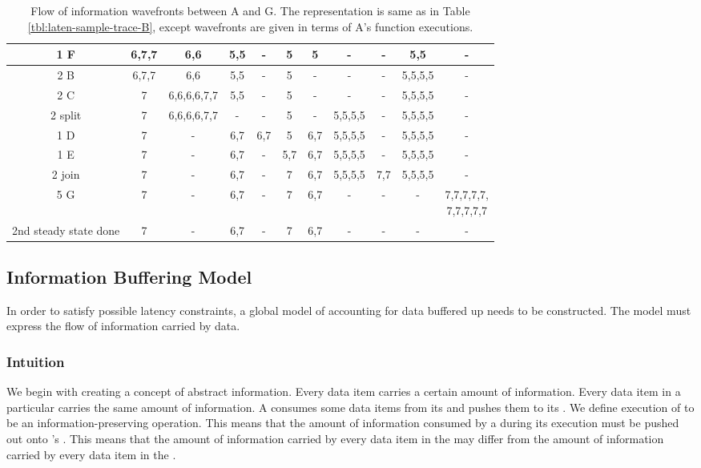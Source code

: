 \begin{table}
\begin{tabular}{|c|c|c|c|c|c|c|c|c|c|c|}
\hline 1 F & 6,7,7 & 6,6 & 5,5 & - & 5 & 5 & - & - & 5,5 & - \\
\hline 2 B & 6,7,7 & 6,6 & 5,5 & - & 5 & - & - & - & 5,5,5,5 & - \\
\hline 2 C & 7 & 6,6,6,6,7,7 & 5,5 & - & 5 & - & - & - & 5,5,5,5 & - \\
\hline 2 split & 7 & 6,6,6,6,7,7 & - & - & 5 & - & 5,5,5,5 & - & 5,5,5,5 & - \\
\hline 1 D & 7 & - & 6,7 & 6,7 & 5 & 6,7 & 5,5,5,5 & - & 5,5,5,5 & - \\
\hline 1 E & 7 & - & 6,7 & - & 5,7 & 6,7 & 5,5,5,5 & - & 5,5,5,5 & - \\
\hline 2 join & 7 & - & 6,7 & - & 7 & 6,7 & 5,5,5,5 & 7,7 & 5,5,5,5 & - \\
\hline 5 G & 7 & - & 6,7 & - & 7 & 6,7 & - & - & - & \parbox{0.5in}{7,7,7,7,7, \\ 7,7,7,7,7} \\
\hline \parbox{0.7in}{\centering 2nd steady state done} & 7 & - & 6,7 & - & 7 & 6,7 & - & - & - & - \\
\hline
\end{tabular}
\caption[Flow of information wavefronts between {\filters} A and G
in Figure \ref{fig:constrained-example}]{Flow of information
wavefronts between {\filters} A and G. The representation is same
as in Table \ref{tbl:laten-sample-trace-B}, except wavefronts are
given in terms of {\filter} A's {\work} function executions.}
\label{tbl:laten-sample-trace-A}
\end{table}

\subsection{Information Buffering Model}
\label{sec:constrained:info}

In order to satisfy possible latency constraints, a global model
of accounting for data buffered up needs to be constructed.  The
model must express the flow of information carried by data.

\subsubsection{Intuition}

We begin with creating a concept of abstract information.  Every
data item carries a certain amount of information.  Every data
item in a particular {\Channel} carries the same amount of
information.  A {\filter} consumes some data items from its {\Input}
{\Channel} and pushes them to its {\Output} {\Channel}.  We define
execution of {\filters} to be an information-preserving operation.
This means that the amount of information consumed by a {\filter}
during its execution must be pushed out onto {\filter}'s {\Output}
{\Channel}. This means that the amount of information carried by
every data item in the {\Input} {\Channel} may differ from the amount
of information carried by every data item in the {\Output} {\Channel}.

